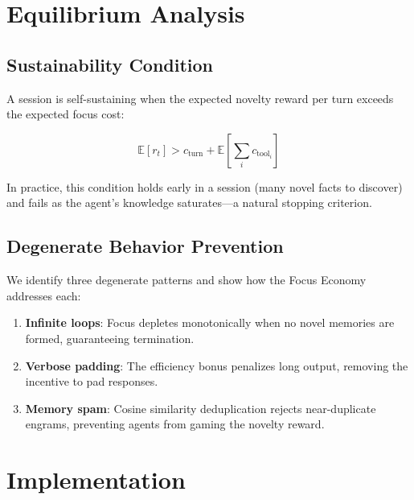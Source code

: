 \documentclass[man,12pt,floatsintext]{apa7}
\begin{document}
\section{Equilibrium Analysis}


\subsection{Sustainability Condition}

A session is self-sustaining when the expected novelty reward per turn exceeds the
expected focus cost:

\begin{equation}
  \mathbb{E}[r_t] > c_{\text{turn}} + \mathbb{E}\left[\sum_i c_{\text{tool}_i}\right]
\end{equation}

In practice, this condition holds early in a session (many novel facts to discover) and
fails as the agent's knowledge saturates---a natural stopping criterion.

\subsection{Degenerate Behavior Prevention}

We identify three degenerate patterns and show how the Focus Economy addresses each:

\begin{enumerate}
  \item \textbf{Infinite loops}: Focus depletes monotonically when no novel memories are
        formed, guaranteeing termination.
  \item \textbf{Verbose padding}: The efficiency bonus penalizes long output, removing
        the incentive to pad responses.
  \item \textbf{Memory spam}: Cosine similarity deduplication rejects near-duplicate
        engrams, preventing agents from gaming the novelty reward.
\end{enumerate}

\section{Implementation}
\end{document}
